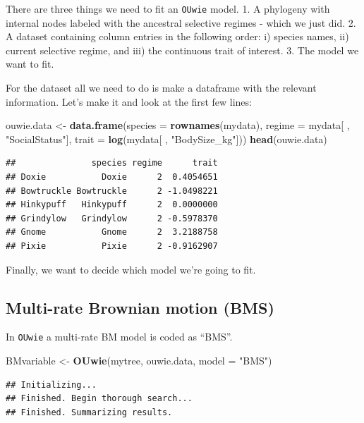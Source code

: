 \documentclass[]{book}
\newenvironment{Shaded}{\begin{snugshade}}{\end{snugshade}}
\newcommand{\KeywordTok}[1]{\textcolor[rgb]{0.13,0.29,0.53}{\textbf{{#1}}}}
\newcommand{\DataTypeTok}[1]{\textcolor[rgb]{0.13,0.29,0.53}{{#1}}}
\newcommand{\StringTok}[1]{\textcolor[rgb]{0.31,0.60,0.02}{{#1}}}
\newcommand{\NormalTok}[1]{{#1}}
\begin{document}
There are three things we need to fit an \texttt{OUwie} model. 1. A
phylogeny with internal nodes labeled with the ancestral selective
regimes - which we just did. 2. A dataset containing column entries in
the following order: i) species names, ii) current selective regime, and
iii) the continuous trait of interest. 3. The model we want to fit.

For the dataset all we need to do is make a dataframe with the relevant
information. Let's make it and look at the first few lines:

\begin{Shaded}
\begin{Highlighting}[]
\NormalTok{ouwie.data <-}\StringTok{ }\KeywordTok{data.frame}\NormalTok{(}\DataTypeTok{species =} \KeywordTok{rownames}\NormalTok{(mydata), }\DataTypeTok{regime =} \NormalTok{mydata[ , }\StringTok{"SocialStatus"}\NormalTok{],}
\DataTypeTok{trait =} \KeywordTok{log}\NormalTok{(mydata[ , }\StringTok{"BodySize_kg"}\NormalTok{]))}
\KeywordTok{head}\NormalTok{(ouwie.data)}
\end{Highlighting}
\end{Shaded}

\begin{verbatim}
##               species regime      trait
## Doxie           Doxie      2  0.4054651
## Bowtruckle Bowtruckle      2 -1.0498221
## Hinkypuff   Hinkypuff      2  0.0000000
## Grindylow   Grindylow      2 -0.5978370
## Gnome           Gnome      2  3.2188758
## Pixie           Pixie      2 -0.9162907
\end{verbatim}

Finally, we want to decide which model we're going to fit.

\subsection{Multi-rate Brownian motion
(BMS)}\label{multi-rate-brownian-motion-bms}

In \texttt{OUwie} a multi-rate BM model is coded as ``BMS''.

\begin{Shaded}
\begin{Highlighting}[]
\NormalTok{BMvariable <-}\StringTok{ }\KeywordTok{OUwie}\NormalTok{(mytree, ouwie.data, }\DataTypeTok{model =} \StringTok{"BMS"}\NormalTok{)}
\end{Highlighting}
\end{Shaded}

\begin{verbatim}
## Initializing... 
## Finished. Begin thorough search... 
## Finished. Summarizing results.
\end{verbatim}
\end{document}
